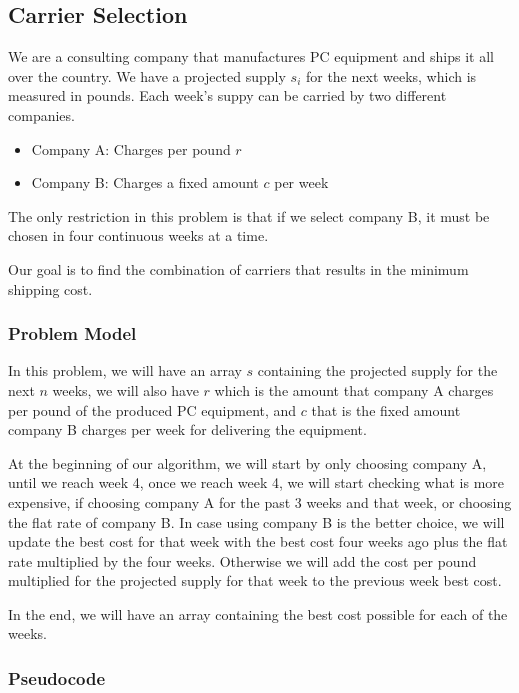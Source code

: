 \documentclass{article}
\begin{document}

\subsection*{Carrier Selection}

We are a consulting company that manufactures PC equipment and ships it all over the country. We have a projected supply $s_i$ for the next weeks, which is measured in pounds. Each week's suppy can be carried by two different companies.

\begin{itemize}
 \item Company A: Charges per pound $r$
 \item Company B: Charges a fixed amount $c$ per week
\end{itemize}

The only restriction in this problem is that if we select company B, it must be chosen in four continuous weeks at a time.

Our goal is to find the combination of carriers that results in the minimum shipping cost.

\subsubsection*{Problem Model}

In this problem, we will have an array $s$ containing the projected supply for the next $n$ weeks, we will also have $r$ which is the amount that company A charges per pound of the produced PC equipment, and $c$ that is the fixed amount company B charges per week for delivering the equipment.

At the beginning of our algorithm, we will start by only choosing company A, until we reach week 4, once we reach week 4, we will start checking  what is more expensive, if choosing company A for the past 3 weeks and that week, or choosing the flat rate of company B. In case using company B is the better choice, we will update the best cost for that week with the best cost four weeks ago plus the flat rate multiplied by the four weeks. Otherwise we will add the cost per pound multiplied for the projected supply for that week to the previous week best cost.

In the end, we will have an array containing the best cost possible for each of the weeks.

\subsubsection*{Pseudocode}
\end{document}
